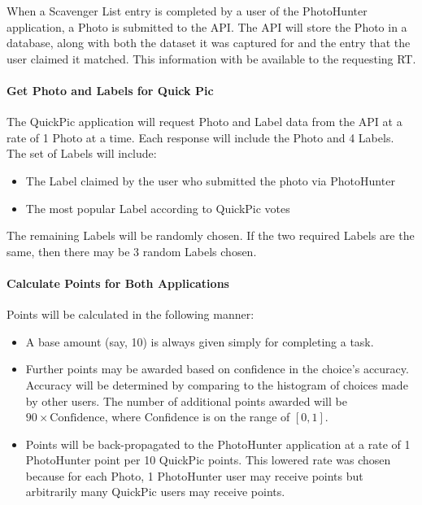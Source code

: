 \documentclass{article}
\begin{document}
When a Scavenger List entry is completed by a user of the PhotoHunter
application, a Photo is submitted to the API.  The API will store the Photo in
a database, along with both the dataset it was captured for and the entry that
the user claimed it matched.  This information with be available to the
requesting RT.

\paragraph{Get Photo and Labels for Quick Pic}

The QuickPic application will request Photo and Label data from the API at a
rate of 1 Photo at a time.  Each response will include the Photo and 4 Labels.
The set of Labels will include:

\begin{itemize}
  \item The Label claimed by the user who submitted the photo via PhotoHunter
  \item The most popular Label according to QuickPic votes
\end{itemize}

The remaining Labels will be randomly chosen.  If the two required Labels are
the same, then there may be 3 random Labels chosen.

\paragraph{Calculate Points for Both Applications}

Points will be calculated in the following manner:

\begin{itemize}
  \item A base amount (say, 10) is always given simply for completing a task.
  \item Further points may be awarded based on confidence in the choice's
    accuracy.  Accuracy will be determined by comparing to the histogram of
    choices made by other users.  The number of additional points awarded will
    be $90 \times \text{Confidence}$, where Confidence is on the range of
    $[0, 1]$.

  \item Points will be back-propagated to the PhotoHunter application at a rate
    of 1 PhotoHunter point per 10 QuickPic points.  This lowered rate was
    chosen because for each Photo, 1 PhotoHunter user may receive points but
    arbitrarily many QuickPic users may receive points.
\end{itemize}
\end{document}
